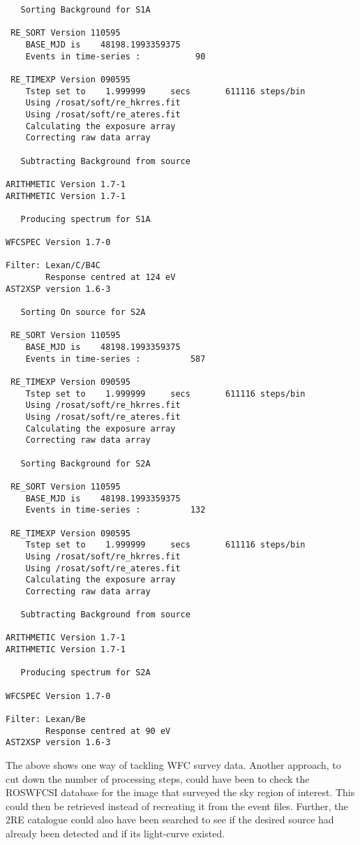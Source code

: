 \begin{small}
\begin{verbatim}
   Sorting Background for S1A
 
 RE_SORT Version 110595   
    BASE_MJD is    48198.1993359375     
    Events in time-series :           90

 RE_TIMEXP Version 090595      
    Tstep set to    1.999999     secs       611116 steps/bin
    Using /rosat/soft/re_hkrres.fit
    Using /rosat/soft/re_ateres.fit
    Calculating the exposure array
    Correcting raw data array
 
   Subtracting Background from source 
 
ARITHMETIC Version 1.7-1
ARITHMETIC Version 1.7-1
 
   Producing spectrum for S1A
 
WFCSPEC Version 1.7-0

Filter: Lexan/C/B4C
        Response centred at 124 eV
AST2XSP version 1.6-3
 
   Sorting On source for S2A

 RE_SORT Version 110595   
    BASE_MJD is    48198.1993359375     
    Events in time-series :          587

 RE_TIMEXP Version 090595      
    Tstep set to    1.999999     secs       611116 steps/bin
    Using /rosat/soft/re_hkrres.fit
    Using /rosat/soft/re_ateres.fit
    Calculating the exposure array
    Correcting raw data array
 
   Sorting Background for S2A

 RE_SORT Version 110595   
    BASE_MJD is    48198.1993359375     
    Events in time-series :          132

 RE_TIMEXP Version 090595      
    Tstep set to    1.999999     secs       611116 steps/bin
    Using /rosat/soft/re_hkrres.fit
    Using /rosat/soft/re_ateres.fit
    Calculating the exposure array
    Correcting raw data array
 
   Subtracting Background from source 
 
ARITHMETIC Version 1.7-1
ARITHMETIC Version 1.7-1
 
   Producing spectrum for S2A
 
WFCSPEC Version 1.7-0

Filter: Lexan/Be
        Response centred at 90 eV
AST2XSP version 1.6-3

\end{verbatim}
\end{small}

The above shows one way of tackling \ro WFC survey data.  Another
approach, to cut down the number of processing steps, could have been to check 
the ROSWFCSI database for the image that surveyed the sky region of interest.  
This could then be retrieved instead of recreating it from the event files.  
Further, the 2RE catalogue could also have been searched to see if the desired
source had already been detected and if its light-curve existed.


